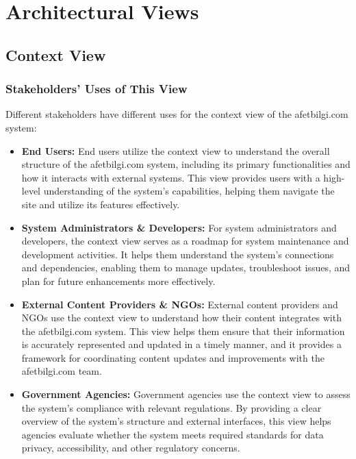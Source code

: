 \documentclass[12pt, letterpaper]{article}
\begin{document}
\newpage


\section{Architectural Views}

\subsection{Context View}

\subsubsection{Stakeholders' Uses of This View}
Different stakeholders have different uses for the context view of the afetbilgi.com system:

\begin{itemize}
    \item \textbf{End Users:} End users utilize the context view to understand the overall structure of the afetbilgi.com system, including its primary functionalities and how it interacts with external systems. This view provides users with a high-level understanding of the system's capabilities, helping them navigate the site and utilize its features effectively.

    \item \textbf{System Administrators \& Developers:} For system administrators and developers, the context view serves as a roadmap for system maintenance and development activities. It helps them understand the system's connections and dependencies, enabling them to manage updates, troubleshoot issues, and plan for future enhancements more effectively.

    \item \textbf{External Content Providers \& NGOs:} External content providers and NGOs use the context view to understand how their content integrates with the afetbilgi.com system. This view helps them ensure that their information is accurately represented and updated in a timely manner, and it provides a framework for coordinating content updates and improvements with the afetbilgi.com team.

    \item \textbf{Government Agencies:} Government agencies use the context view to assess the system's compliance with relevant regulations. By providing a clear overview of the system's structure and external interfaces, this view helps agencies evaluate whether the system meets required standards for data privacy, accessibility, and other regulatory concerns.
\end{itemize}
\end{document}
